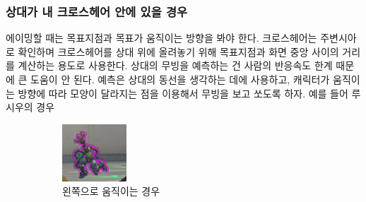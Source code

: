 \subsubsection{상대가 내 크로스헤어 안에 있을 경우}
에이밍할 때는 목표지점과 목표가 움직이는 방향을 봐야 한다. 크로스헤어는 주변시아로 확인하며 크로스헤어를 상대 위에 올려놓기 위해 목표지점과 화면 중앙 사이의 거리를 계산하는 용도로 사용한다.
상대의 무빙을 예측하는 건 사람의 반응속도 한계 때문에 큰 도움이 안 된다. 예측은 상대의 동선을 생각하는 데에 사용하고, 캐릭터가 움직이는 방향에 따라 모양이 달라지는 점을 이용해서 무빙을 보고 쏘도록 하자. 예를 들어 루시우의 경우
    \begin{figure}[htp]
         \centering
         \begin{subfigure}[b]{0.3\textwidth}
             \centering
             \includegraphics[width=\textwidth]{figures/read_moving/left.png}
             \caption{왼쪽으로 움직이는 경우}
             \label{fig:1-a}
         \end{subfigure}
         \hfill
         \begin{subfigure}[b]{0.3\textwidth}
             \centering

\end{subfigure}
\end{figure}
